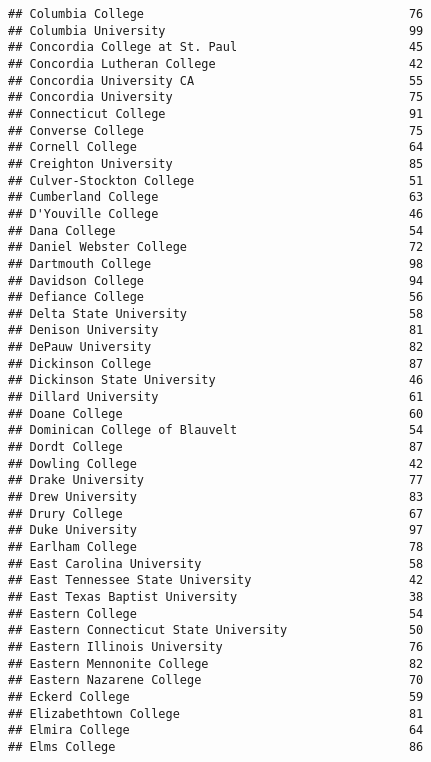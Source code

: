 \documentclass[
]{article}
\begin{document}
\begin{verbatim}
## Columbia College                                     76
## Columbia University                                  99
## Concordia College at St. Paul                        45
## Concordia Lutheran College                           42
## Concordia University CA                              55
## Concordia University                                 75
## Connecticut College                                  91
## Converse College                                     75
## Cornell College                                      64
## Creighton University                                 85
## Culver-Stockton College                              51
## Cumberland College                                   63
## D'Youville College                                   46
## Dana College                                         54
## Daniel Webster College                               72
## Dartmouth College                                    98
## Davidson College                                     94
## Defiance College                                     56
## Delta State University                               58
## Denison University                                   81
## DePauw University                                    82
## Dickinson College                                    87
## Dickinson State University                           46
## Dillard University                                   61
## Doane College                                        60
## Dominican College of Blauvelt                        54
## Dordt College                                        87
## Dowling College                                      42
## Drake University                                     77
## Drew University                                      83
## Drury College                                        67
## Duke University                                      97
## Earlham College                                      78
## East Carolina University                             58
## East Tennessee State University                      42
## East Texas Baptist University                        38
## Eastern College                                      54
## Eastern Connecticut State University                 50
## Eastern Illinois University                          76
## Eastern Mennonite College                            82
## Eastern Nazarene College                             70
## Eckerd College                                       59
## Elizabethtown College                                81
## Elmira College                                       64
## Elms College                                         86

\end{verbatim}
\end{document}
